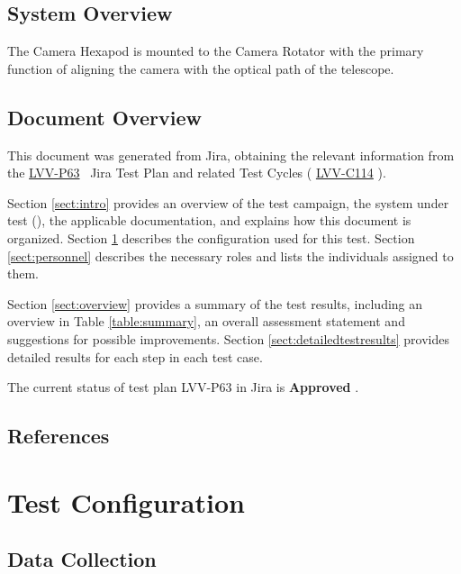 \documentclass[SE,lsstdraft,STR,toc]{lsstdoc}
\begin{document}
\subsection{System Overview}
\label{sect:systemoverview}

The Camera Hexapod is mounted to the Camera Rotator with the primary
function of aligning the camera with the optical path of the telescope.


\subsection{Document Overview}
\label{sect:docoverview}

This document was generated from Jira, obtaining the relevant information from the 
\href{https://jira.lsstcorp.org/secure/Tests.jspa#/testPlan/LVV-P63}{LVV-P63}
~Jira Test Plan and related Test Cycles (
  \href{https://jira.lsstcorp.org/secure/Tests.jspa#/testCycle/LVV-C114}{LVV-C114}
).

Section \ref{sect:intro} provides an overview of the test campaign, the system under test (\product{}), the applicable documentation, and explains how this document is organized.
Section \ref{sect:configuration}  describes the configuration used for this test.
Section \ref{sect:personnel} describes the necessary roles and lists the individuals assigned to them.

Section \ref{sect:overview} provides a summary of the test results, including an overview in Table \ref{table:summary}, an overall assessment statement and suggestions for possible improvements.
Section \ref{sect:detailedtestresults} provides detailed results for each step in each test case.

The current status of test plan LVV-P63 in Jira is \textbf{ Approved }.

\subsection{References}
\label{sect:references}
\renewcommand{\refname}{}

\section{Test Configuration}
\label{sect:configuration}

\subsection{Data Collection}
\end{document}
